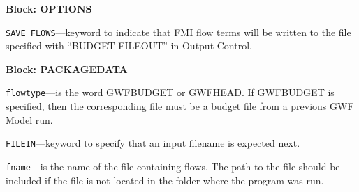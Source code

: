 
\item \textbf{Block: OPTIONS}

\begin{description}
\item \texttt{SAVE\_FLOWS}---keyword to indicate that FMI flow terms will be written to the file specified with ``BUDGET FILEOUT'' in Output Control.

\end{description}
\item \textbf{Block: PACKAGEDATA}

\begin{description}
\item \texttt{flowtype}---is the word GWFBUDGET or GWFHEAD.  If GWFBUDGET is specified, then the corresponding file must be a budget file from a previous GWF Model run.

\item \texttt{FILEIN}---keyword to specify that an input filename is expected next.

\item \texttt{fname}---is the name of the file containing flows.  The path to the file should be included if the file is not located in the folder where the program was run.

\end{description}

